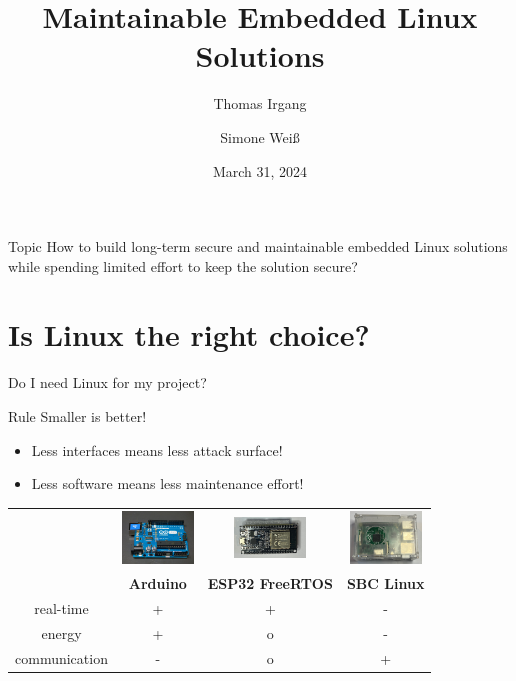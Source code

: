 \documentclass{beamer}
\title{Maintainable Embedded Linux Solutions}
\author{Thomas Irgang \and Simone Weiß}
\institute{EASTERHEGG 2024 - RABBIT PROTOTYPING}
\date{March 31, 2024}
\begin{document}
\begin{frame}
    \titlepage
\end{frame}

\begin{frame}
	\begin{block}{Topic}
		How to build long-term secure and maintainable embedded Linux solutions
		while spending limited effort to keep the solution secure?
	\end{block}
\end{frame}

\section{Is Linux the right choice?}

\begin{frame}{Do I need Linux for my project?}
	\begin{block}{Rule}
		Smaller is better!
	\end{block}

	\begin{itemize}
		\item Less interfaces means less attack surface!
		\item Less software means less maintenance effort!
	\end{itemize}

	\begin{tabular}{cccc}
	&\includegraphics[width=1.9cm]{assets/Pixabay_Arduino_integrated-circuit-441289_1280.jpg} &
	\includegraphics[width=1.9cm]{assets/ESP32.png} & 
	\includegraphics[width=1.9cm]{assets/Raspberry_Pi.png} \\
	&\textbf{Arduino} & \textbf{ESP32 FreeRTOS} & \textbf{SBC Linux} \\
	real-time & + &  + & - \\
	energy & + & o & - \\
	communication & - & o & + \\
	\end{tabular}
\end{frame}
\end{document}
